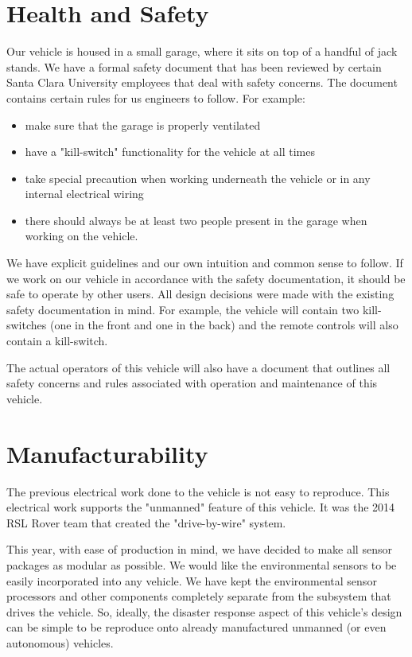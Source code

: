 \section{Health and Safety} Our vehicle is housed in a small garage, where it sits on top of a handful of jack stands. We have a formal safety document that has been reviewed by certain Santa Clara University employees that deal with safety concerns. The document contains certain rules for us engineers to follow. For example:	
\begin{itemize}
\item make sure that the garage is properly ventilated 
\item have a "kill-switch" functionality for the vehicle at all times 
\item take special precaution when working underneath the vehicle or in any internal electrical wiring
\item there should always be at least two people present in the garage when working on the vehicle. 
\end{itemize}
We have explicit guidelines and our own intuition and common sense to follow. If we work on our vehicle in accordance with the safety documentation, it should be safe to operate by other users. All design decisions were made with the existing safety documentation in mind. For example, the vehicle will contain two kill-switches (one in the front and one in the back) and the remote controls will also contain a kill-switch.

The actual operators of this vehicle will also have a document that outlines all safety concerns and rules associated with operation and maintenance of this vehicle. 


\section{Manufacturability} The previous electrical work done to the vehicle is not easy to reproduce. This electrical work supports the "unmanned" feature of this vehicle. It was the 2014 RSL Rover team that created the "drive-by-wire" system. \cite{rslrover2014} 

This year, with ease of production in mind, we have decided to make all sensor packages as modular as possible. We would like the environmental sensors to be easily incorporated into any vehicle. We have kept the environmental sensor processors and other components completely separate from the subsystem that drives the vehicle. So, ideally, the disaster response aspect of this vehicle's design can be simple to be reproduce onto already manufactured unmanned (or even autonomous) vehicles. 

